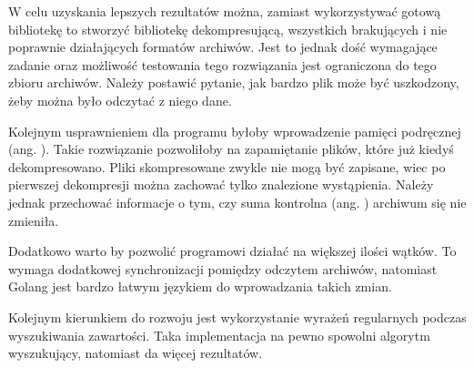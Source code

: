 W celu uzyskania lepszych rezultatów można, zamiast wykorzystywać gotową 
bibliotekę to stworzyć bibliotekę dekompresującą, wszystkich brakujących i nie
poprawnie działających formatów archiwów. Jest to jednak dość wymagające zadanie
oraz możliwość testowania tego rozwiązania jest ograniczona do tego zbioru archiwów. 
Należy postawić pytanie, jak bardzo plik może być uszkodzony, żeby można było
odczytać z niego dane.

Kolejnym usprawnieniem dla programu byłoby wprowadzenie pamięci podręcznej (ang. ).
Takie rozwiązanie pozwoliłoby na zapamiętanie plików, które już kiedyś dekompresowano.
Pliki skompresowane zwykle nie mogą być zapisane, wiec po pierwszej dekompresji
można zachować tylko znalezione wystąpienia. Należy jednak przechować 
informacje o tym, czy suma kontrolna (ang. ) archiwum się nie 
zmieniła.

Dodatkowo warto by pozwolić programowi działać na większej ilości wątków. To 
wymaga dodatkowej synchronizacji pomiędzy odczytem archiwów, natomiast
Golang jest bardzo łatwym językiem do wprowadzania takich zmian.

Kolejnym kierunkiem do rozwoju jest wykorzystanie wyrażeń regularnych podczas
wyszukiwania zawartości. Taka implementacja na pewno spowolni algorytm 
wyszukujący, natomiast da więcej rezultatów.